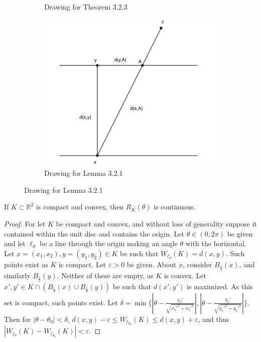\documentclass[crop=false,class=book,oneside]{standalone}
\begin{document}
\begin{figure}[H]
\begin{subfigure}[b]{0.32\textwidth}
                \caption{Drawing for Theorem 3.2.3}
              \end{subfigure}
              \begin{subfigure}[b]{0.32\textwidth}
                \centering
                \includegraphics[width=\textwidth]{line-1.png}
                \caption{Drawing for Lemma 3.2.1}
              \end{subfigure}  
            \end{figure}
            \begin{theorem}
            If $K\subset \mathbb{R}^2$ is compact and convex, then $R_K(\theta)$ is continuous.
            \end{theorem}
            \begin{proof}
            For let $K$ be compact and convex, and without loss of generality suppose it contained within the unit disc and contains the origin. Let $\theta\in (0,2\pi)$ be given and let $\ell_{\theta}$ be a line through the origin making an angle $\theta$ with the horizontal. Let $x=(x_1,x_2),y=(y_1,y_2)\in K$ be such that $W_{\ell_{\theta}}(K) = d(x,y)$. Such points exist as $K$ is compact. Let $\varepsilon>0$ be given. About $x$, consider $B_{\frac{\varepsilon}{2}}(x)$, and similarly $B_{\frac{\varepsilon}{2}}(y)$. Neither of these are empty, as $K$ is convex. Let $x',y'\in K\cap(B_{\frac{\varepsilon}{2}}(x)\cup B_{\frac{\varepsilon}{2}}(y))$ be such that $d(x',y')$ is maximized. As this set is compact, such points exist. Let $\delta = \min\{|\theta-\frac{x_2'}{\sqrt{x_1'^2+x_2'^2}}|,|\theta-\frac{y_2'}{\sqrt{y_1'^2+y_2'^2}}|\}$. Then for $|\theta-\theta_0|<\delta$, $d(x,y)-\varepsilon \leq W_{\ell_{\theta_0}}(K)\leq d(x,y)+\varepsilon$, and thus $|W_{\ell_\theta}(K)-W_{\ell_{\theta_0}}(K)| < \varepsilon$.
            \end{proof}
\end{document}
